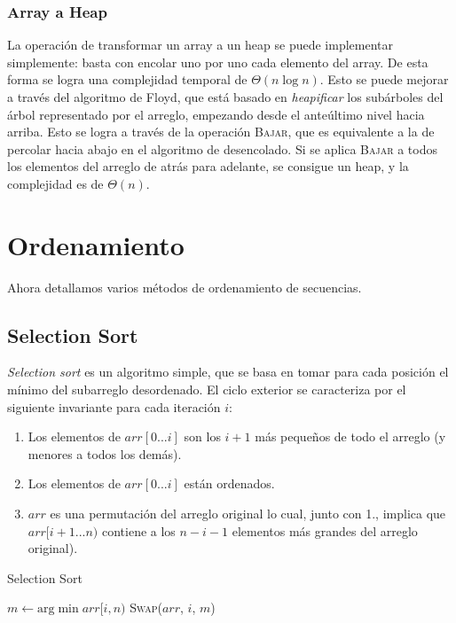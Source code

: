 \documentclass{article}
\newcommand{\BigTheta}[1]{{\Theta(#1)}}
\begin{document}
\subsubsection{Array a Heap}
\label{subsubsec-floyd}

La operación de transformar un array a un heap se puede implementar simplemente: basta con encolar uno por uno cada elemento del array. De esta forma se logra una complejidad temporal de $\BigTheta{n\log{n}}$. Esto se puede mejorar a través del algoritmo de Floyd, que está basado en \textit{heapificar} los subárboles del árbol representado por el arreglo, empezando desde el anteúltimo nivel hacia arriba. Esto se logra a través de la operación \textsc{Bajar}, que es equivalente a la de percolar hacia abajo en el algoritmo de desencolado. Si se aplica \textsc{Bajar} a todos los elementos del arreglo de atrás para adelante, se consigue un heap, y la complejidad es de $\BigTheta{n}$.

\section{Ordenamiento}

Ahora detallamos varios métodos de ordenamiento de secuencias.

\subsection{Selection Sort}

\textit{Selection sort} es un algoritmo simple, que se basa en tomar para cada posición el mínimo del subarreglo desordenado. El ciclo exterior se caracteriza por el siguiente invariante para cada iteración $i$:
\begin{enumerate}
    \item Los elementos de $arr[0...i]$ son los $i+1$ más pequeños de todo el arreglo (y menores a todos los demás).
    \item Los elementos de $arr[0...i]$ están ordenados.
    \item $arr$ es una permutación del arreglo original lo cual, junto con 1., implica que $arr[i+1...n)$ contiene a los $n - i - 1$ elementos más grandes del arreglo original).
\end{enumerate}

\begin{algorithm}[H]
    \caption*{Selection Sort}
    \begin{algorithmic}
        \State $m \gets \text{arg} \min{arr[i, n)}$
        \State \textsc{Swap}($arr$, $i$, $m$)
        \EndFor
    \end{algorithmic}
\end{algorithm}
\end{document}
